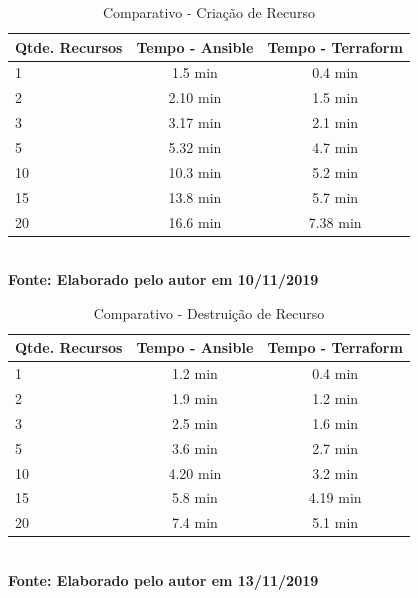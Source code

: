\begin{table}[H]
	\centering
	\caption{\hspace{0.1cm} Comparativo - Criação de Recurso}
	\vspace{-0.3cm} %
	\label{tab:tabela1}
	\begin{tabular}{l|c|c}
  \hline
    \textbf{Qtde. Recursos}	& \textbf{Tempo - Ansible} & \textbf{Tempo - Terraform} \\
    \hline
  1   & 1.5 min   & 0.4  min    \\
2   & 2.10  min   & 1.5  min    \\
3   & 3.17  min   & 2.1  min    \\
5   & 5.32  min   & 4.7  min     \\
10  & 10.3  min   & 5.2  min      \\
15  & 13.8  min   & 5.7  min      \\
20  & 16.6  min   & 7.38 min      \\

     \hline
 \end{tabular}
 	\vspace{.1cm}  %
	\small
	{\footnotesize\\ \textbf{Fonte:  Elaborado pelo autor em 10/11/2019}}
\end{table}


\begin{table}[H]
	\centering
	\caption{\hspace{0.1cm} Comparativo - Destruição de Recurso}
	\vspace{-0.3cm} %
	\label{tab:tabela2}
	\begin{tabular}{l|c|c}
  \hline
    \textbf{Qtde. Recursos}	& \textbf{Tempo - Ansible} & \textbf{Tempo - Terraform} \\
    \hline
  1   & 1.2  min   & 0.4  min    \\
2   & 1.9    min   & 1.2  min    \\
3   & 2.5    min   & 1.6  min    \\
5   & 3.6    min   & 2.7  min     \\
10  & 4.20   min   & 3.2  min      \\
15  & 5.8    min   & 4.19 min      \\
20  & 7.4    min   & 5.1  min      \\

     \hline
 \end{tabular}
 	\vspace{.1cm}  %
	\small
	{\footnotesize\\ \textbf{Fonte: Elaborado pelo autor em 13/11/2019}}
\end{table}


